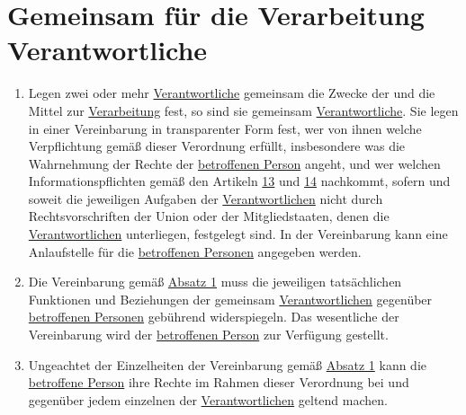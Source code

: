\chapter{Gemeinsam für die Verarbeitung Verantwortliche}
\label{ch:26}


\begin{enumerate}

  \item Legen zwei oder mehr \hyperref[itm:04-7]{Verantwortliche} gemeinsam die Zwecke der und die Mittel zur \hyperref
   [itm:04-2]{Verarbeitung} fest, so sind sie gemeinsam \hyperref[itm:04-7]{Verantwortliche}. Sie legen in einer
   Vereinbarung in transparenter Form fest, wer von ihnen welche Verpflichtung gemäß dieser Verordnung erfüllt,
   insbesondere was die Wahrnehmung der Rechte der \hyperref[itm:04-1]{betroffenen Person} angeht, und wer welchen
   Informationspflichten gemäß den Artikeln \hyperref[ch:13]{13} und \hyperref[ch:14]{14} nachkommt, sofern und soweit
   die jeweiligen Aufgaben der \hyperref[itm:04-7]{Verantwortlichen} nicht durch Rechtsvorschriften der Union oder der
   Mitgliedstaaten, denen die \hyperref[itm:04-7]{Verantwortlichen} unterliegen, festgelegt sind. In der Vereinbarung
   kann eine Anlaufstelle für die \hyperref[itm:04-1]{betroffenen Personen} angegeben werden.
  \label{itm:26-1}

  \item Die Vereinbarung gemäß \hyperref[itm:26-1]{Absatz 1} muss die jeweiligen tatsächlichen Funktionen und
   Beziehungen der gemeinsam \hyperref[itm:04-7]{Verantwortlichen} gegenüber \hyperref[itm:04-1]{betroffenen Personen}
   gebührend widerspiegeln. Das wesentliche der Vereinbarung wird der \hyperref[itm:04-1]{betroffenen Person} zur
   Verfügung gestellt.
  \label{itm:26-2}

  \item Ungeachtet der Einzelheiten der Vereinbarung gemäß \hyperref[itm:26-1]{Absatz 1} kann die \hyperref[itm:04-1]
   {betroffene Person} ihre Rechte im Rahmen dieser Verordnung bei und gegenüber jedem einzelnen der \hyperref
   [itm:04-7]{Verantwortlichen} geltend machen.
  \label{itm:26-3}

\end{enumerate}


